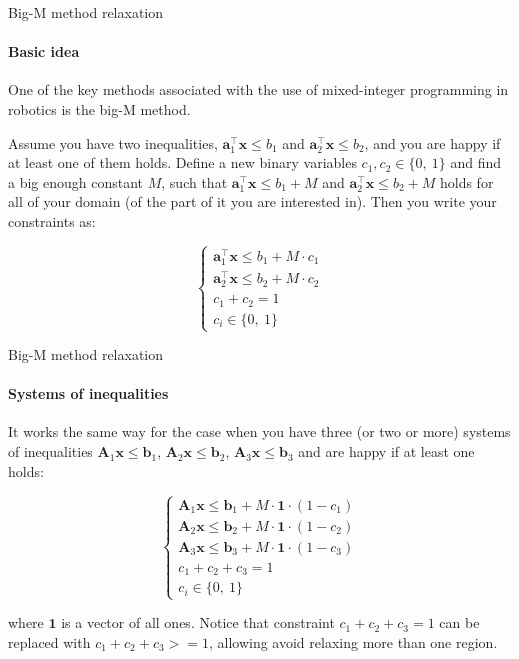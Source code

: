 \documentclass{beamer}
\begin{document}
\begin{frame}{Big-M method relaxation}
\framesubtitle{Basic idea}
\begin{flushleft}


One of the key methods associated with the use of mixed-integer programming in robotics is the big-M method. 

\bigskip

Assume you have two inequalities, $\mathbf{a}_1^\top \mathbf{x} \leq b_1$ and $\mathbf{a}_2^\top \mathbf{x} \leq b_2$, and you are happy if at least one of them holds. Define a new binary variables $c_1, c_2 \in \{0, \ 1 \}$ and find a big enough constant $M$, such that $\mathbf{a}_1^\top \mathbf{x} \leq b_1 + M$ and $\mathbf{a}_2^\top \mathbf{x} \leq b_2 + M$ holds for all of your domain (of the part of it you are interested in). Then you write your constraints as:

\begin{equation}
    \begin{cases}
    \mathbf{a}_1^\top \mathbf{x} \leq b_1 + M \cdot c_1 \\
    \mathbf{a}_2^\top \mathbf{x} \leq b_2 + M \cdot c_2 \\
    c_1 + c_2 = 1  \\
    c_i  \in \{0, \ 1 \}
    \end{cases}
\end{equation}

\end{flushleft}
\end{frame}




\begin{frame}{Big-M method relaxation}
\framesubtitle{Systems of inequalities}
\begin{flushleft}

It works the same way for the case when you have three (or two or more) systems of inequalities $\mathbf{A}_1 \mathbf{x} \leq \mathbf{b}_1$, $\mathbf{A}_2 \mathbf{x} \leq \mathbf{b}_2$, $\mathbf{A}_3 \mathbf{x} \leq \mathbf{b}_3$ and are happy if at least one holds:

\begin{equation}
    \begin{cases}
    \mathbf{A}_1 \mathbf{x} \leq \mathbf{b}_1 + M \cdot \mathbf{1} \cdot (1 - c_1) \\
    \mathbf{A}_2 \mathbf{x} \leq \mathbf{b}_2 + M \cdot \mathbf{1} \cdot (1 - c_2) \\
    \mathbf{A}_3 \mathbf{x} \leq \mathbf{b}_3 + M \cdot \mathbf{1} \cdot (1 - c_3) \\
    c_1 + c_2 + c_3 = 1 \\
    c_i  \in \{0, \ 1 \}
    \end{cases}
\end{equation}

where $\mathbf{1}$ is a vector of all ones. Notice that constraint $c_1 + c_2 + c_3 = 1$ can be replaced with $c_1 + c_2 + c_3 >= 1$, allowing avoid relaxing more than one region.

\end{flushleft}
\end{frame}
\end{document}
